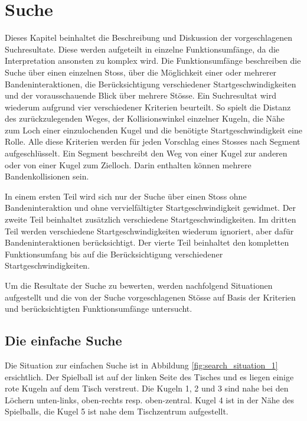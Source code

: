 \section{Suche}
Dieses Kapitel beinhaltet die Beschreibung und Diskussion der vorgeschlagenen Suchresultate. Diese werden aufgeteilt
in einzelne Funktionsumfänge, da die Interpretation ansonsten zu komplex wird. Die Funktionsumfänge beschreiben die Suche
über einen einzelnen Stoss, über die Möglichkeit einer oder mehrerer Bandeninteraktionen, die Berücksichtigung verschiedener
Startgeschwindigkeiten und der vorausschauende Blick über mehrere Stösse.
Ein Suchresultat wird wiederum aufgrund vier verschiedener
Kriterien beurteilt. So spielt die Distanz des zurückzulegenden Weges, der Kollisionswinkel einzelner Kugeln, die Nähe
zum Loch einer einzulochenden Kugel und die benötigte Startgeschwindigkeit eine Rolle. Alle diese Kriterien werden für
jeden Vorschlag eines Stosses nach Segment aufgeschlüsselt. Ein Segment beschreibt den Weg von einer Kugel zur anderen
oder von einer Kugel zum Zielloch. Darin enthalten können mehrere Bandenkollisionen sein.

In einem ersten Teil wird sich nur der Suche über einen Stoss ohne Bandeninteraktion und ohne
vervielfältigter Startgeschwindigkeit gewidmet. Der zweite Teil beinhaltet zusätzlich verschiedene Startgeschwindigkeiten.
Im dritten Teil werden verschiedene Startgeschwindigkeiten wiederum ignoriert, aber dafür Bandeninteraktionen berücksichtigt.
Der vierte Teil beinhaltet den kompletten Funktionsumfang bis auf die Berücksichtigung verschiedener Startgeschwindigkeiten.

Um die Resultate der Suche zu bewerten, werden nachfolgend Situationen aufgestellt und die von der Suche
vorgeschlagenen Stösse auf Basis der Kriterien und berücksichtigten Funktionsumfänge untersucht.

\subsection{Die einfache Suche}\label{kap:suche:die_einfache_suche}
Die Situation zur einfachen Suche ist in Abbildung \ref{fig:search_situation_1} ersichtlich.
Der Spielball ist auf der linken Seite des Tisches und es liegen einige rote Kugeln auf dem Tisch verstreut.
Die Kugeln 1, 2 und 3 sind nahe bei den Löchern unten-links, oben-rechts resp. oben-zentral.
Kugel 4 ist in der Nähe des Spielballs, die Kugel 5 ist nahe dem Tischzentrum aufgestellt.

